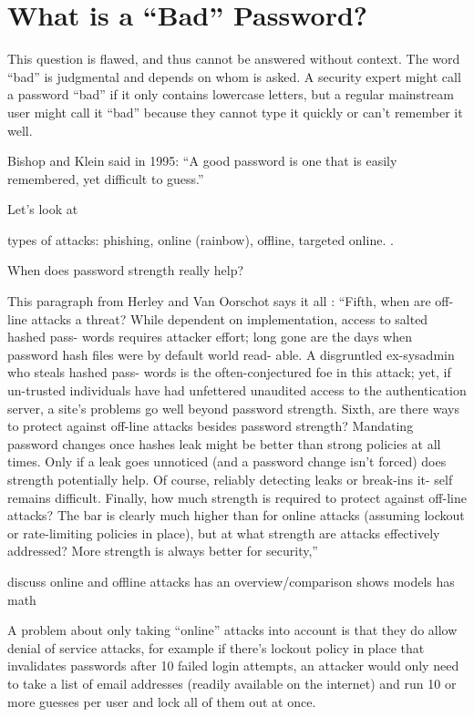 \section{What is a ``Bad'' Password?}
This question is flawed, and thus cannot be answered without context. The word ``bad'' is judgmental and depends on whom is asked. A security expert might call a password ``bad'' if it only contains lowercase letters, but a regular mainstream user might call it ``bad'' because they cannot type it quickly or can't remember it well. 

Bishop and Klein said in 1995: ``A good password is one that is easily remembered, yet difficult to guess.'' \cite[p. 231]{Bishop1995ProactivePasswordChecking}

Let's look at 

types of attacks: phishing, online (rainbow), offline, targeted online. \cite{ZhangKennedy2016RevisitingPasswordRules}. 

When does password strength really help? 

This paragraph from Herley and Van Oorschot says it all \cite{Herley2012PersistenceOfPasswords}:
``Fifth, when are off-line attacks a threat? While dependent on implementation, access to salted hashed pass- words requires attacker effort; long gone are the days when password hash files were by default world read- able. A disgruntled ex-sysadmin who steals hashed pass- words is the often-conjectured foe in this attack; yet, if un-trusted individuals have had unfettered unaudited access to the authentication server, a site’s problems go well beyond password strength. Sixth, are there ways to protect against off-line attacks besides password strength? Mandating password changes once hashes leak might be better than strong policies at all times. Only if a leak goes unnoticed (and a password change isn’t forced) does strength potentially help. Of course, reliably detecting leaks or break-ins it- self remains difficult. Finally, how much strength is required to protect against off-line attacks? The bar is clearly much higher than for online attacks (assuming lockout or rate-limiting policies in place), but at what strength are attacks effectively addressed? More strength is always better for security,'' 

discuss online and offline attacks
\cite{Wang2016fuzzyPWM} has an overview/comparison
\cite{Florencio2014AdministratorsGuide} shows models
\cite{Florencio2014PasswordPortfoliosFiniteUser} has math

A problem about only taking ``online'' attacks into account is that they do allow denial of service attacks, for example if there's lockout policy in place that invalidates passwords after 10 failed login attempts, an attacker would only need to take a list of email addresses (readily available on the internet) and run 10 or more guesses per user and lock all of them out at once. 



